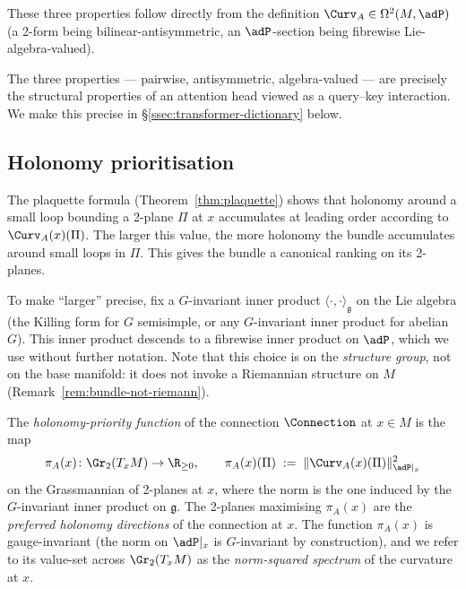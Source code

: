 These three properties follow directly from the definition $\Curv_A
\in\Omega^2(M,\adP)$ (a 2-form being bilinear-antisymmetric, an
$\adP$-section being fibrewise Lie-algebra-valued).

The three properties --- pairwise, antisymmetric, algebra-valued ---
are precisely the structural properties of an attention head viewed
as a query--key interaction. We make this precise in
\S\ref{ssec:transformer-dictionary} below.

\subsection{Holonomy prioritisation}\label{ssec:holonomy-priority}

The plaquette formula (Theorem~\ref{thm:plaquette}) shows that
holonomy around a small loop bounding a 2-plane $\Pi$ at $x$
accumulates at leading order according to $\Curv_A(x)(\Pi)$. The
larger this value, the more holonomy the bundle accumulates around
small loops in $\Pi$. This gives the bundle a canonical ranking on
its 2-planes.

To make ``larger'' precise, fix a $G$-invariant inner product
$\langle\cdot,\cdot\rangle_\mathfrak{g}$ on the Lie algebra (the
Killing form for $G$ semisimple, or any $G$-invariant inner product
for abelian $G$). This inner product descends to a fibrewise inner
product on $\adP$, which we use without further notation. Note that
this choice is on the \emph{structure group}, not on the base
manifold: it does not invoke a Riemannian structure on $M$
(Remark~\ref{rem:bundle-not-riemann}).

\begin{definition}\label{def:holonomy-priority}
The \emph{holonomy-priority function} of the connection $\Connection$
at $x\in M$ is the map
\[
   \pi_A(x)\colon \Gr_2(T_xM) \to \R_{\geq 0},
   \qquad
   \pi_A(x)(\Pi) \;:=\; \|\Curv_A(x)(\Pi)\|_{\adP|_x}^2
\]
on the Grassmannian of 2-planes at $x$, where the norm is the one
induced by the $G$-invariant inner product on $\mathfrak{g}$. The
2-planes maximising $\pi_A(x)$ are the \emph{preferred holonomy
directions} of the connection at $x$. The function $\pi_A(x)$ is
gauge-invariant (the norm on $\adP|_x$ is $G$-invariant by
construction), and we refer to its value-set across $\Gr_2(T_xM)$
as the \emph{norm-squared spectrum} of the curvature at $x$.
\end{definition}

